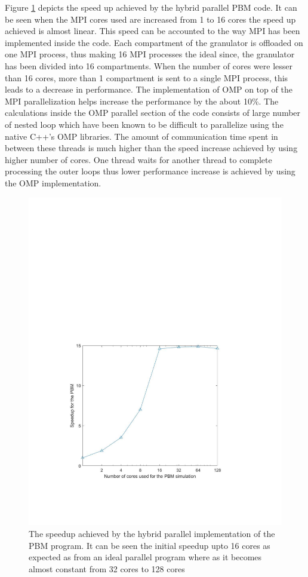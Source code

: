 \documentclass[preprint,11pt,authoryear]{elsarticle}
\begin{document}
Figure \ref{fig:rslts_PBM_speed_up} depicts the speed up achieved by the hybrid parallel PBM code. It 
can be seen when the MPI cores used are increased from 1 to 16 cores the speed up achieved is 
almost linear. This speed can be accounted to the way MPI has been implemented inside the code. 
Each compartment of the granulator is  offloaded on one MPI process, thus making 16 MPI processes 
the ideal since, the granulator has been divided into 16 compartments. When the number of cores 
were lesser than 16 cores, more than 1 compartment is sent to a single MPI process, this leads to a 
decrease in performance. The implementation of OMP on top of the MPI parallelization helps increase 
the performance by the about 10\%. The calculations inside the OMP parallel section of the code 
consists of large number of nested loop which have been known to be difficult to parallelize 
\citep{He2016} using the native C++'s OMP libraries. The amount of communication time spent in 
between these threads is much higher than the speed increase achieved by using higher number of 
cores. One thread waits for another thread to complete processing the outer loops thus lower 
performance increase is achieved by using the OMP implementation. \\

\begin{figure}[H]
\centering
\includegraphics[scale=1]{rslsts_PBM_speedup_logx.pdf}
\caption{The speedup achieved by the hybrid parallel implementation of the PBM program. It can be 
seen the initial speedup upto 16 cores as expected as from an ideal parallel program where as it 
becomes almost constant from 32 cores to 128 cores}
\label{fig:rslts_PBM_speed_up}
\end{figure}
\end{document}
